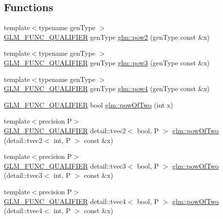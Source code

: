 \subsection*{Functions}
\begin{DoxyCompactItemize}
\item 
{\footnotesize template$<$typename gen\+Type $>$ }\\\hyperlink{setup_8hpp_a33fdea6f91c5f834105f7415e2a64407}{G\+L\+M\+\_\+\+F\+U\+N\+C\+\_\+\+Q\+U\+A\+L\+I\+F\+I\+ER} gen\+Type \hyperlink{group__gtx__optimum__pow_gad18baedb0f3eaea4b4544771e19574f5}{glm\+::pow2} (gen\+Type const \&x)
\item 
{\footnotesize template$<$typename gen\+Type $>$ }\\\hyperlink{setup_8hpp_a33fdea6f91c5f834105f7415e2a64407}{G\+L\+M\+\_\+\+F\+U\+N\+C\+\_\+\+Q\+U\+A\+L\+I\+F\+I\+ER} gen\+Type \hyperlink{group__gtx__optimum__pow_ga47dbbd973d7ad8be1b135d57281e16cf}{glm\+::pow3} (gen\+Type const \&x)
\item 
{\footnotesize template$<$typename gen\+Type $>$ }\\\hyperlink{setup_8hpp_a33fdea6f91c5f834105f7415e2a64407}{G\+L\+M\+\_\+\+F\+U\+N\+C\+\_\+\+Q\+U\+A\+L\+I\+F\+I\+ER} gen\+Type \hyperlink{group__gtx__optimum__pow_gabae007bac8e442a2601db03de5827107}{glm\+::pow4} (gen\+Type const \&x)
\item 
\hyperlink{setup_8hpp_a33fdea6f91c5f834105f7415e2a64407}{G\+L\+M\+\_\+\+F\+U\+N\+C\+\_\+\+Q\+U\+A\+L\+I\+F\+I\+ER} bool \hyperlink{group__gtx__optimum__pow_ga399b24df28267c1f061c462dd359affd}{glm\+::pow\+Of\+Two} (int x)
\item 
{\footnotesize template$<$precision P$>$ }\\\hyperlink{setup_8hpp_a33fdea6f91c5f834105f7415e2a64407}{G\+L\+M\+\_\+\+F\+U\+N\+C\+\_\+\+Q\+U\+A\+L\+I\+F\+I\+ER} detail\+::tvec2$<$ bool, P $>$ \hyperlink{group__gtx__optimum__pow_ga2dff80972edb8f4be69e40bb27ed0a9b}{glm\+::pow\+Of\+Two} (detail\+::tvec2$<$ int, P $>$ const \&x)
\item 
{\footnotesize template$<$precision P$>$ }\\\hyperlink{setup_8hpp_a33fdea6f91c5f834105f7415e2a64407}{G\+L\+M\+\_\+\+F\+U\+N\+C\+\_\+\+Q\+U\+A\+L\+I\+F\+I\+ER} detail\+::tvec3$<$ bool, P $>$ \hyperlink{group__gtx__optimum__pow_ga103cbf6e3d63ab4c2bb5449e19b8639d}{glm\+::pow\+Of\+Two} (detail\+::tvec3$<$ int, P $>$ const \&x)
\item 
{\footnotesize template$<$precision P$>$ }\\\hyperlink{setup_8hpp_a33fdea6f91c5f834105f7415e2a64407}{G\+L\+M\+\_\+\+F\+U\+N\+C\+\_\+\+Q\+U\+A\+L\+I\+F\+I\+ER} detail\+::tvec4$<$ bool, P $>$ \hyperlink{group__gtx__optimum__pow_ga3471bc7e9e580f6b76647cb5156135cc}{glm\+::pow\+Of\+Two} (detail\+::tvec4$<$ int, P $>$ const \&x)
\end{DoxyCompactItemize}
